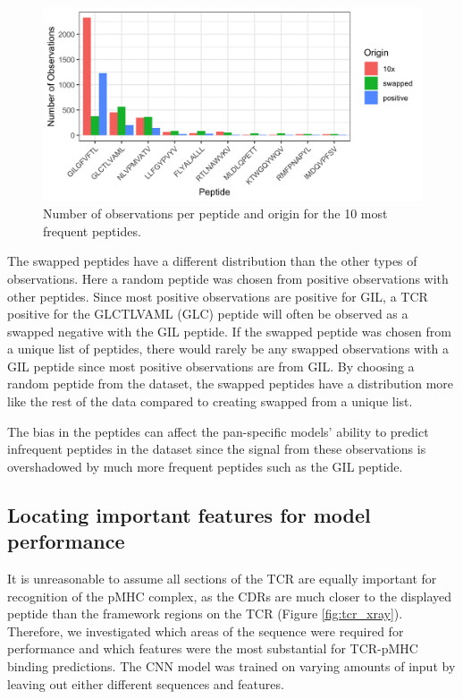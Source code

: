 \begin{figure}[H]
    \centering
    \includegraphics[width = \linewidth]{figures/Observations_per_peptide.png}
    \caption{Number of observations per peptide and origin for the 10 most frequent peptides.}
    \label{fig:obs_per_pep}
\end{figure}

The swapped peptides have a different distribution than the other types of observations. Here a random peptide was chosen from positive observations with other peptides. Since most positive observations are positive for GIL, a TCR positive for the GLCTLVAML (GLC) peptide will often be observed as a swapped negative with the GIL peptide. If the swapped peptide was chosen from a unique list of peptides, there would rarely be any swapped observations with a GIL peptide since most positive observations are from GIL. By choosing a random peptide from the dataset, the swapped peptides have a distribution more like the rest of the data compared to creating swapped from a unique list.

The bias in the peptides can affect the pan-specific models' ability to predict infrequent peptides in the dataset since the signal from these observations is overshadowed by much more frequent peptides such as the GIL peptide.

\subsection{Locating important features for model performance}
It is unreasonable to assume all sections of the TCR are equally important for recognition of the pMHC complex, as the CDRs are much closer to the displayed peptide than the framework regions on the TCR (Figure \ref{fig:tcr_xray}). Therefore, we investigated which areas of the sequence were required for performance and which features were the most substantial for TCR-pMHC binding predictions. The CNN model was trained on varying amounts of input by leaving out either different sequences and features.

